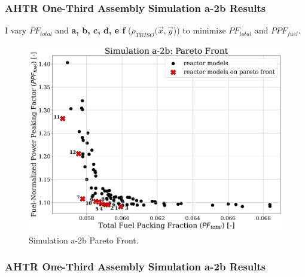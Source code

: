 \begin{frame}
    \frametitle{AHTR One-Third Assembly Simulation a-2b Results}
    I vary $PF_{total}$ and \textbf{a, b, c, d, e f} ($\rho_{TRISO}(\vec{x}, \vec{y}$))
    to minimize $PF_{total}$ and $PPF_{fuel}$. 
    \begin{figure}
        \includegraphics[width=0.65\linewidth]{../docs/figures/assem-obj-2-pfppf-pareto.png} 
        \caption{Simulation a-2b Pareto Front.}
    \end{figure}
\end{frame}

\begin{frame}
    \frametitle{AHTR One-Third Assembly Simulation a-2b Results}
\end{frame}

